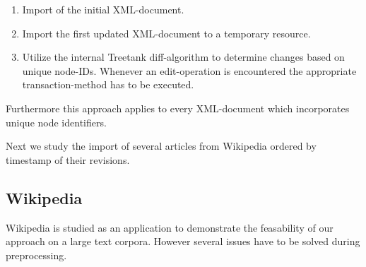 \begin{enumerate}
\item Import of the initial XML-document.
\item Import the first updated XML-document to a temporary resource.
\item Utilize the internal Treetank diff-algorithm to determine changes based on unique node-IDs. Whenever an edit-operation is encountered the appropriate transaction-method has to be executed. %
\end{enumerate}

Furthermore this approach applies to every XML-document which incorporates unique node identifiers.

Next we study the import of several articles from Wikipedia ordered by timestamp of their revisions. 

\subsection{Wikipedia}
Wikipedia is studied as an application to demonstrate the feasability of our approach on a large text corpora. However several issues have to be solved during preprocessing.

